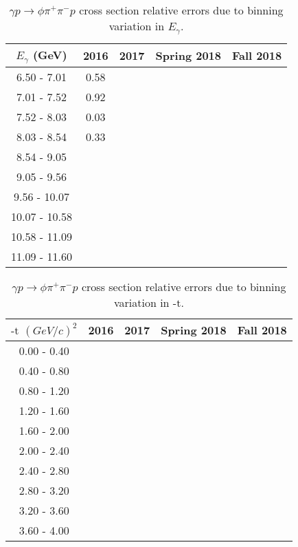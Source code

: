 \begin{table}[!htbp]
    \centering
    \caption{$\gamma p \rightarrow \phi \pi^{+} \pi^{-} p$ cross section relative errors due to binning variation in $E_{\gamma}$.}
    \label{tab.syserr.5.3.1}
    \begin{tabular}{|c|c|c|c|c|}
        \hline
        $E_{\gamma}$ (GeV) & 2016 & 2017 & Spring 2018 & Fall 2018 \\
        \hline
        6.50 - 7.01 & 0.58 &  &  &  \\
        7.01 - 7.52 & 0.92 &  &  &  \\
        7.52 - 8.03 & 0.03 &  &  &  \\
        8.03 - 8.54 & 0.33 &  &  &  \\
        8.54 - 9.05 &  &  &  &  \\
        9.05 - 9.56 &  &  &  &  \\
        9.56 - 10.07 &  &  &  &  \\
        10.07 - 10.58 &  &  &  &  \\
        10.58 - 11.09  &  &  &  &  \\
        11.09 - 11.60 &  &  &  &  \\
        \hline
    \end{tabular}
\end{table}

\begin{table}[!htbp]
    \centering
    \caption{$\gamma p \rightarrow \phi \pi^{+} \pi^{-} p$ cross section relative errors due to binning variation in $\mbox{-t}$.}
    \label{tab.syserr.5.3.2}
    \begin{tabular}{|c|c|c|c|c|}
        \hline
        $\mbox{-t}$ $(GeV/c)^{2}$ & 2016 & 2017 & Spring 2018 & Fall 2018 \\
        \hline
        0.00 - 0.40 &  &  &  &  \\
        0.40 - 0.80 &  &  &  &  \\
        0.80 - 1.20 &  &  &  &  \\
        1.20 - 1.60 &  &  &  &  \\
        1.60 - 2.00 &  &  &  &  \\
        2.00 - 2.40 &  &  &  &  \\
        2.40 - 2.80 &  &  &  &  \\
        2.80 - 3.20 &  &  &  &  \\
        3.20 - 3.60 &  &  &  &  \\
        3.60 - 4.00 &  &  &  &  \\
        \hline
    \end{tabular}
\end{table}


